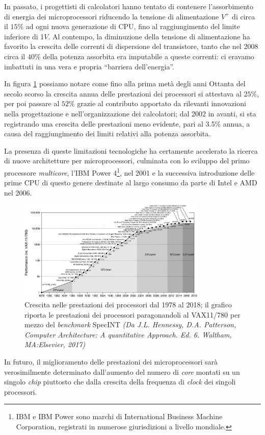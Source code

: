 In passato, i progettisti di calcolatori hanno tentato di contenere l'assorbimento di energia dei microprocessori riducendo la tensione di alimentazione $V^{+}$ di circa il $15\%$ ad ogni nuova generazione di CPU, fino al raggiungimento del limite inferiore di 1$\si{V}$.\newline
Al contempo, la diminuzione della tensione di alimentazione ha favorito la crescita delle correnti di dispersione del transistore, tanto che nel 2008 circa il $40\%$ della potenza assorbita era imputabile a queste correnti: ci eravamo imbattuti in una vera e propria \enquote{barriera dell'energia}.

In figura \ref{fig:PrestazioniProcessori} possiamo notare come fino alla prima met\`a degli anni Ottanta del secolo scorso la crescita annua delle prestazioni dei processori si attestava al $25\%$, per poi passare al $52\%$ grazie al contributo apportato da rilevanti innovazioni nella progettazione e nell'organizzazione dei calcolatori; dal 2002 in avanti, si sta registrando una crescita delle prestazioni meno evidente, pari al \num{3.5}\% annua, a causa del raggiungimento dei limiti relativi alla potenza assorbita.

La presenza di queste limitazioni tecnologiche ha certamente accelerato la ricerca di nuove architetture per microprocessori, culminata con lo sviluppo del primo processore \textit{multicore}, l'IBM Power\textsuperscript{\textregistered} 4\footnote{IBM e IBM Power sono marchi di International Business Machine Corporation, registrati in numerose giurisdizioni a livello mondiale.}, nel 2001 e la successiva introduzione delle prime CPU di questo genere destinate al largo consumo da parte di Intel e AMD nel 2006.
\begin{figure}[htbp]
    \centering
    \includegraphics[width=0.8\textwidth]{../Risorse/Capitolo 1/PrestazioniProcessori}

    \caption{Crescita nelle prestazioni dei processori dal 1978 al 2018; il grafico riporta le prestazioni dei processori paragonandoli al VAX11/780 per mezzo del \textit{benchmark} SpecINT \small{\textit{(Da J.L. Hennessy, D.A. Patterson, Computer Architecture: A quantitative Approach. Ed. 6. Waltham, MA:Elsevier, 2017)}}}
    \label{fig:PrestazioniProcessori}
\end{figure}\newline
In futuro, il miglioramento delle prestazioni dei microprocessori sar\`a verosimilmente determinato dall'aumento del numero di \textit{core} montati su un singolo \textit{chip} piuttosto che dalla crescita della frequenza di \textit{clock} dei singoli processori.
